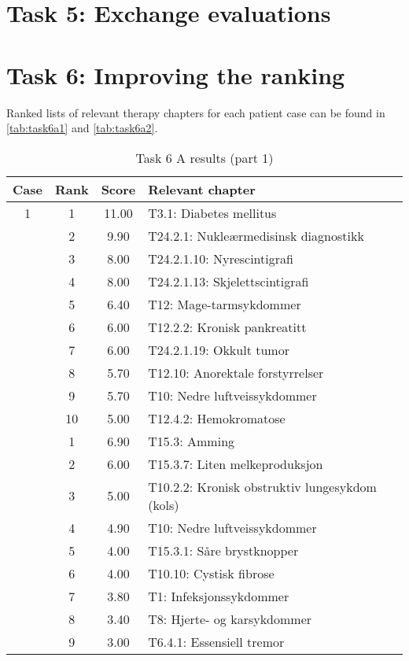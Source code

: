 \section{Task 5: Exchange evaluations}


\section{Task 6: Improving the ranking}
Ranked lists of relevant therapy chapters for each patient case can be found
in \autoref{tab:task6a1} and \autoref{tab:task6a2}.
\begin{table}[htbp] \footnotesize \center
\caption{Task 6 A results (part 1)\label{tab:task6a1}}
\begin{tabular}{c c c l}
    \toprule
    Case & Rank & Score & Relevant chapter \\
    \midrule
    1 & 1 & 11.00 & T3.1: Diabetes mellitus \\
     & 2 & 9.90 & T24.2.1: Nukleærmedisinsk diagnostikk \\
     & 3 & 8.00 & T24.2.1.10: Nyrescintigrafi \\
     & 4 & 8.00 & T24.2.1.13: Skjelettscintigrafi \\
     & 5 & 6.40 & T12: Mage-tarmsykdommer \\
     & 6 & 6.00 & T12.2.2: Kronisk pankreatitt \\
     & 7 & 6.00 & T24.2.1.19: Okkult tumor \\
     & 8 & 5.70 & T12.10: Anorektale forstyrrelser \\
     & 9 & 5.70 & T10: Nedre luftveissykdommer \\
     & 10 & 5.00 & T12.4.2: Hemokromatose \\
	\addlinespace
    2 & 1 & 6.90 & T15.3: Amming \\
     & 2 & 6.00 & T15.3.7: Liten melkeproduksjon \\
     & 3 & 5.00 & T10.2.2: Kronisk obstruktiv lungesykdom (kols) \\
     & 4 & 4.90 & T10: Nedre luftveissykdommer \\
     & 5 & 4.00 & T15.3.1: Såre brystknopper \\
     & 6 & 4.00 & T10.10: Cystisk fibrose \\
     & 7 & 3.80 & T1: Infeksjonssykdommer \\
     & 8 & 3.40 & T8: Hjerte- og karsykdommer \\
     & 9 & 3.00 & T6.4.1: Essensiell tremor \\

\end{tabular}
\end{table}
